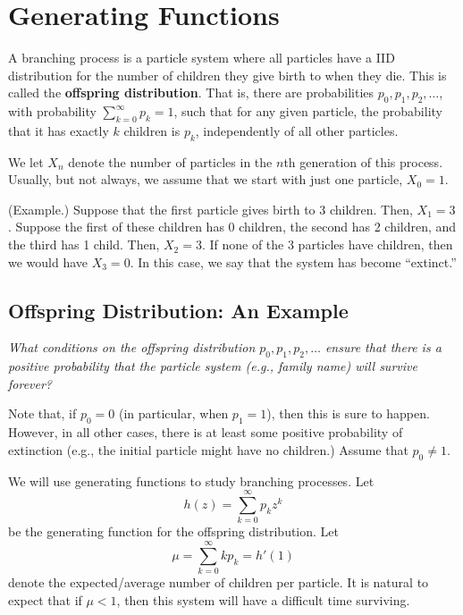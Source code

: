 \documentclass[letterpaper]{article}
\begin{document}
\section{Generating Functions}
A branching process is a particle system where all particles have a IID distribution for the number of children they give birth to when they die. This is called the \textbf{offspring distribution}. That is, there are probabilities $p_0, p_1, p_2, \dots$, with probability $\sum_{k = 0}^{\infty} p_k = 1$, such that for any given particle, the probability that it has exactly $k$ children is $p_k$, independently of all other particles. 

\bigskip 

We let $X_n$ denote the number of particles in the $n$th generation of this process. Usually, but not always, we assume that we start with just one particle, $X_0 = 1$. 

\begin{mdframed}[]
    (Example.) Suppose that the first particle gives birth to 3 children. Then, $X_1 = 3$. Suppose the first of these children has 0 children, the second has 2 children, and the third has 1 child. Then, $X_2 = 3$. If none of the 3 particles have children, then we would have $X_3 = 0$. In this case, we say that the system has become ``extinct.''
\end{mdframed}


\subsection{Offspring Distribution: An Example}
\emph{What conditions on the offspring distribution $p_0, p_1, p_2, \dots$ ensure that there is a positive probability that the particle system (e.g., family name) will survive forever?}

\bigskip 

Note that, if $p_0 = 0$ (in particular, when $p_1 = 1$), then this is sure to happen. However, in all other cases, there is at least some positive probability of extinction (e.g., the initial particle might have no children.) Assume that $p_0 \neq 1$. 

\bigskip

We will use generating functions to study branching processes. Let
\[h(z) = \sum_{k = 0}^{\infty} p_k z^k\]
be the generating function for the offspring distribution. Let 
\[\mu = \sum_{k = 0}^{\infty} kp_k = h'(1)\]
denote the expected/average number of children per particle. It is natural to expect that if $\mu < 1$, then this system will have a difficult time surviving. 
\end{document}

